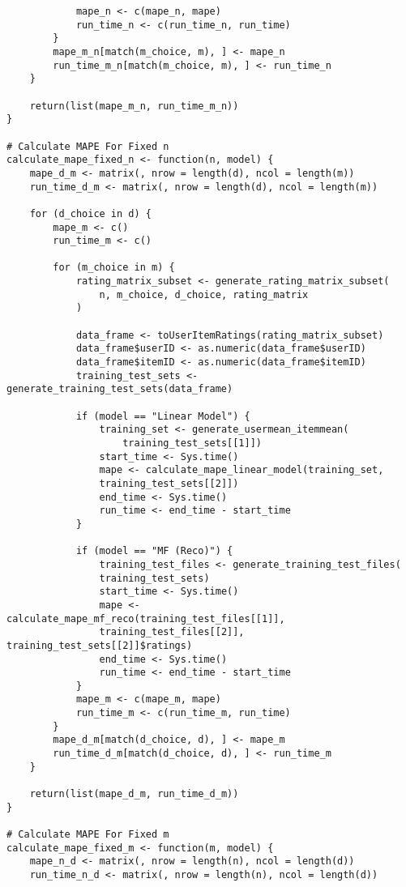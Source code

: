 \documentclass[12pt]{article}
\begin{document}
\begin{singlespace}
\begin{verbatim}
            mape_n <- c(mape_n, mape)
            run_time_n <- c(run_time_n, run_time)
        }
        mape_m_n[match(m_choice, m), ] <- mape_n
        run_time_m_n[match(m_choice, m), ] <- run_time_n
    }

    return(list(mape_m_n, run_time_m_n))
}

# Calculate MAPE For Fixed n
calculate_mape_fixed_n <- function(n, model) {
    mape_d_m <- matrix(, nrow = length(d), ncol = length(m))
    run_time_d_m <- matrix(, nrow = length(d), ncol = length(m))

    for (d_choice in d) {
        mape_m <- c()
        run_time_m <- c()

        for (m_choice in m) {
            rating_matrix_subset <- generate_rating_matrix_subset(
                n, m_choice, d_choice, rating_matrix
            )

            data_frame <- toUserItemRatings(rating_matrix_subset)
            data_frame$userID <- as.numeric(data_frame$userID)
            data_frame$itemID <- as.numeric(data_frame$itemID)
            training_test_sets <- generate_training_test_sets(data_frame)

            if (model == "Linear Model") {
                training_set <- generate_usermean_itemmean(
                    training_test_sets[[1]])
                start_time <- Sys.time()
                mape <- calculate_mape_linear_model(training_set,
                training_test_sets[[2]])
                end_time <- Sys.time()
                run_time <- end_time - start_time
            }

            if (model == "MF (Reco)") {
                training_test_files <- generate_training_test_files(
                training_test_sets)
                start_time <- Sys.time()
                mape <- calculate_mape_mf_reco(training_test_files[[1]],
                training_test_files[[2]], training_test_sets[[2]]$ratings)
                end_time <- Sys.time()
                run_time <- end_time - start_time
            }
            mape_m <- c(mape_m, mape)
            run_time_m <- c(run_time_m, run_time)
        }
        mape_d_m[match(d_choice, d), ] <- mape_m
        run_time_d_m[match(d_choice, d), ] <- run_time_m
    }

    return(list(mape_d_m, run_time_d_m))
}

# Calculate MAPE For Fixed m
calculate_mape_fixed_m <- function(m, model) {
    mape_n_d <- matrix(, nrow = length(n), ncol = length(d))
    run_time_n_d <- matrix(, nrow = length(n), ncol = length(d))


\end{verbatim}
\end{singlespace}
\end{document}

